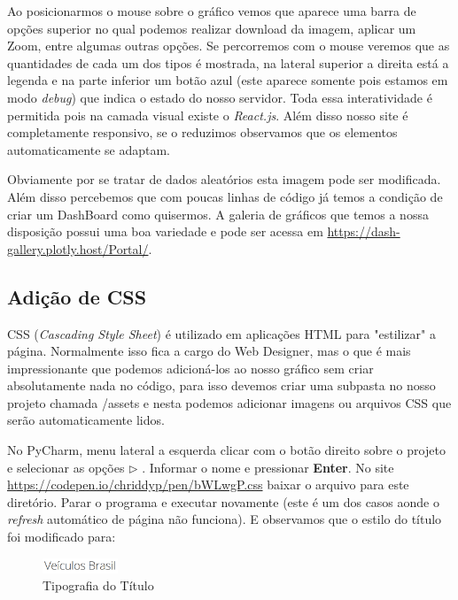 \documentclass[a4paper,11pt]{article}
\begin{document}
Ao posicionarmos o mouse sobre o gráfico vemos que aparece uma barra de opções superior no qual podemos realizar download da imagem, aplicar um Zoom, entre algumas outras opções. Se percorremos com o mouse veremos que as quantidades de cada um dos tipos é mostrada, na lateral superior a direita está a legenda e na parte inferior um botão azul (este aparece somente pois estamos em modo \textit{debug}) que indica o estado do nosso servidor. Toda essa interatividade é permitida pois na camada visual existe o \textit{React.js}. Além disso nosso site é completamente responsivo, se o reduzimos observamos que os elementos automaticamente se adaptam.

Obviamente por se tratar de dados aleatórios esta imagem pode ser modificada. Além disso percebemos que com poucas linhas de código já temos a condição de criar um DashBoard como quisermos. A galeria de gráficos que temos a nossa disposição possui uma boa variedade e pode ser acessa em \url{https://dash-gallery.plotly.host/Portal/}.

\subsection{Adição de CSS}
CSS (\textit{Cascading Style Sheet}) é utilizado em aplicações HTML para "estilizar" a página. Normalmente isso fica a cargo do Web Designer, mas o que é mais impressionante que podemos adicioná-los ao nosso gráfico sem criar absolutamente nada no código, para isso devemos criar uma subpasta no nosso projeto chamada /assets e nesta podemos adicionar imagens ou arquivos CSS que serão automaticamente lidos.

No PyCharm, menu lateral a esquerda clicar com o botão direito sobre o projeto e selecionar as opções  $\triangleright$ . Informar o nome  e pressionar \textbf{Enter}. No site \url{https://codepen.io/chriddyp/pen/bWLwgP.css} baixar o arquivo para este diretório. Parar o programa e executar novamente (este é um dos casos aonde o \textit{refresh} automático de página não funciona). E observamos que o estilo do título  foi modificado para:
\begin{figure}[H]
	\centering
	\includegraphics[width=0.2\textwidth]{imagem/tituloSite}
	\caption{Tipografia do Título}
\end{figure}
\end{document}
